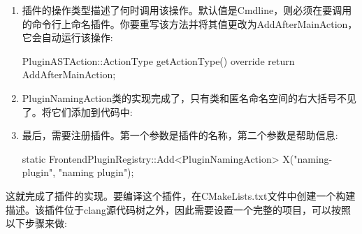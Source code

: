 \begin{enumerate}
\item
插件的操作类型描述了何时调用该操作。默认值是Cmdline，则必须在要调用的命令行上命名插件。你要重写该方法并将其值更改为AddAfterMainAction，它会自动运行该操作:

\begin{cpp}
    PluginASTAction::ActionType getActionType() override {
        return AddAfterMainAction;
    }
\end{cpp}

\item
PluginNamingAction类的实现完成了，只有类和匿名命名空间的右大括号不见了。将它们添加到代码中:

\begin{cpp}
};
}
\end{cpp}

\item
最后，需要注册插件。第一个参数是插件的名称，第二个参数是帮助信息:

\begin{cpp}
static FrontendPluginRegistry::Add<PluginNamingAction> X("naming-plugin",       "naming plugin");
\end{cpp}
\end{enumerate}

这就完成了插件的实现。要编译这个插件，在CMakeLists.txt文件中创建一个构建描述。该插件位于clang源代码树之外，因此需要设置一个完整的项目，可以按照以下步骤来做:

